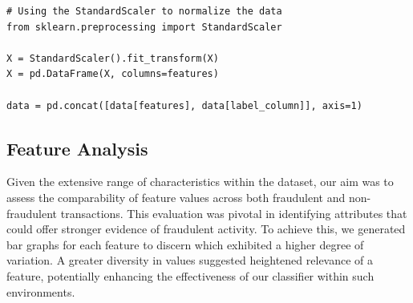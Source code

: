 \documentclass[conference]{IEEEtran}
\begin{document}
\begin{lstlisting}
# Using the StandardScaler to normalize the data
from sklearn.preprocessing import StandardScaler

X = StandardScaler().fit_transform(X)
X = pd.DataFrame(X, columns=features)

data = pd.concat([data[features], data[label_column]], axis=1)
\end{lstlisting}


\subsection{Feature Analysis}

Given the extensive range of characteristics within the dataset, our aim was to assess the comparability of feature values across both fraudulent and non-fraudulent transactions. This evaluation was pivotal in identifying attributes that could offer stronger evidence of fraudulent activity. To achieve this, we generated bar graphs for each feature to discern which exhibited a higher degree of variation. A greater diversity in values suggested heightened relevance of a feature, potentially enhancing the effectiveness of our classifier within such environments.
\end{document}
